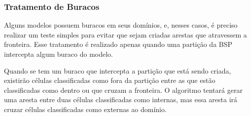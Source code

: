 \subsubsection{Tratamento de Buracos}
\label{sec:Tratamento_buracos}

Alguns modelos possuem buracos em seus domínios, e, nesses casos, é preciso realizar um teste simples para evitar que sejam criadas arestas que atravessem a fronteira. Esse tratamento é realizado apenas quando uma partição da BSP intercepta algum buraco do modelo.

Quando se tem um buraco que intercepta a partição que está sendo criada, existirão células classificadas como fora da partição entre as que estão classificadas como dentro ou que cruzam a fronteira. O algoritmo tentará gerar uma aresta entre duas células classificadas como internas, mas essa aresta irá cruzar células classificadas como externas ao domínio. 

